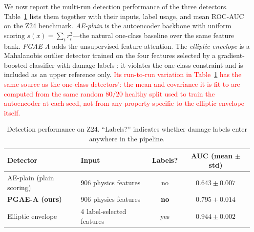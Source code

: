 \documentclass[11pt,a4paper]{article}
\begin{document}
We now report the multi-run detection performance of the three detectors.
Table~\ref{tab:main} lists them together with their inputs, label usage, and
mean ROC-AUC on the Z24 benchmark.
\emph{AE-plain} is the autoencoder backbone with uniform scoring
$s(x)=\sum_i r_i^2$---the natural one-class baseline over the same feature
bank. \emph{PGAE-A} adds the unsupervised feature attention. The
\emph{elliptic envelope} is a Mahalanobis
outlier detector trained on the four features selected by a gradient-boosted
classifier with damage labels \cite{abdrabo2024}; it violates the one-class
constraint and is included as an upper reference only.
\textcolor{red}{Its run-to-run variation in Table~\ref{tab:main} has the same
source as the one-class detectors': the mean and covariance it is fit to
are computed from the same random $80/20$ healthy split used to train the
autoencoder at each seed, not from any property specific to the elliptic
envelope itself.}

\begin{table}[htbp]
\centering
\caption{Detection performance on Z24. ``Labels?'' indicates whether damage labels enter anywhere in the pipeline.}
\label{tab:main}
\small
\begin{tabular}{@{}llcc@{}}
\toprule
\textbf{Detector} & \textbf{Input} & \textbf{Labels?} &
\textbf{AUC (mean $\pm$ std)} \\
\midrule
AE-plain (plain scoring)  & 906 physics features & no  & $0.643 \pm 0.007$ \\
\textbf{PGAE-A (ours)}  & 906 physics features & \textbf{no} &
$\mathbf{0.795 \pm 0.014}$ \\
\midrule
Elliptic envelope       & 4 label-selected features & yes & $0.944 \pm 0.002$ \\
\bottomrule
\end{tabular}
\end{table}
\end{document}
